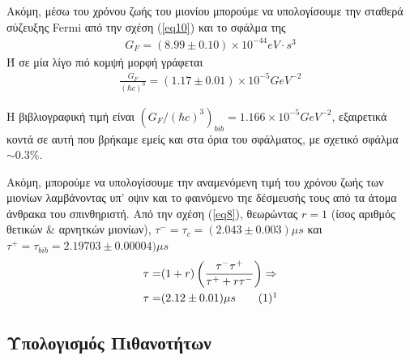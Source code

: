 \documentclass[a4paper]{book}
\newcommand\numberthis{\addtocounter{equation}{1}\tag{\theequation}}
\begin{document}
	Ακόμη, μέσω του χρόνου ζωής του μιονίου μπορούμε να υπολογίσουμε την σταθερά σύζευξης Fermi από την σχέση (\ref{eq10}) και το σφάλμα της\footnotemark
	\begin{align*}\label{eq15}
			G_F = (8.99\pm0.10)\times10^{-44}eV\cdot s^3
		\end{align*}	
	Ή σε μία λίγο πιό κομψή μορφή γράφεται
	\begin{align*}
		\frac{G_F}{(\hbar c)^3} = (1.17 \pm 0.01) \times10^{-5} GeV^{-2}	
	\end{align*}		
	
	Η βιβλιογραφική τιμή είναι $(G_F/(\hbar c)^3)_{bib} =1.166\times10^{-5}GeV^{-2}$, εξαιρετικά κοντά σε αυτή που βρήκαμε εμείς και στα όρια του σφάλματος, με σχετικό σφάλμα $\sim 0.3\%$.
	
	
	Ακόμη, μπορούμε να υπολογίσουμε την αναμενόμενη τιμή του χρόνου ζωής των μιονίων λαμβάνοντας υπ' οψιν και το φαινόμενο τηε δέσμευσής τους από τα άτομα άνθρακα του σπινθηριστή. Από την σχέση (\ref{eq8}), θεωρώντας $r=1$ (ίσος αριθμός θετικών \& αρνητκών μιονίων), $\tau^- =\tau_c = (2.043\pm0.003)\mu s$ και $\tau^+ = \tau_{bib} = 2.19703\pm0.00004)\mu s$ 
	\begin{align*}%
      \tau =& (1+r)\left(\frac{\tau^-\tau^+}{\tau^+ + r\tau^-}\right)\Rightarrow\\
	  \tau =& (2.12 \pm 0.01)\mu s \numberthis \footnotemark
	\end{align*}
	
	
	\newpage
	\subsection*{Υπολογισμός Πιθανοτήτων}
	
\end{document}
